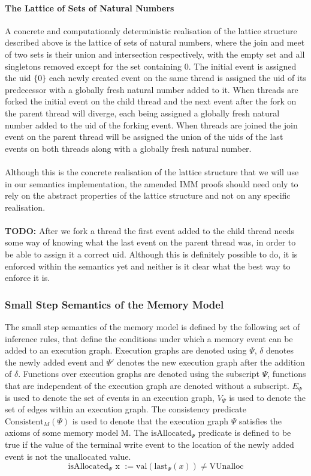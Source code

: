 \paragraph{The Lattice of Sets of Natural Numbers}
A concrete and computationaly deterministic realisation of the lattice structure described above is the lattice of sets of natural numbers, where the join and meet of two sets is their union and intersection respectively, with the empty set and all singletons removed except for the set containing 0.
The initial event is assigned the uid \(\{0\}\) each newly created event on the same thread is assigned the uid of its predecessor with a globally fresh natural number added to it. 
When threads are forked the initial event on the child thread and the next event after the fork on the parent thread will diverge, each being assigned a globally fresh natural number added to the uid of the forking event. 
When threads are joined the join event on the parent thread will be assigned the union of the uids of the last events on both threads along with a globally fresh natural number. \\\\ 
Although this is the concrete realisation of the lattice structure that we will use in our semantics implementation, the amended IMM proofs should need only to rely on the abstract properties of the lattice structure and not on any specific realisation.
\\\\
\textbf{TODO: } After we fork a thread the first event added to the child thread needs some way of knowing what the last event on the parent thread was, in order to be able to assign it a correct uid. Although this is definitely possible 
to do, it is enforced within the semantics yet and neither is it clear what the best way to enforce it is. 

\subsubsection{Small Step Semantics of the Memory Model}
The small step semantics of the memory model is defined by the following set of inference rules, that define the conditions under which a memory event can be added to an execution graph.
Execution graphs are denoted using \( \Psi \), \( \delta \) denotes the newly added event and \( \Psi' \) denotes the new execution graph after the addition of \( \delta \). 
Functions over execution graphs are denoted using the subscript \( \Psi \), functions that are independent of the execution graph are denoted without a subscript. 
\(E_{\Psi}\) is used to denote the set of events in an execution graph, \(V_{\Psi}\) is used to denote the set of edges within an execution graph. 
The consistency predicate \(\text{Consistent}_{M}(\Psi)\) is used to denote that the execution graph \(\Psi\) satisfies the axioms of some memory model M.
The \(\text{isAllocated}_{\Psi}\) predicate is defined to be true if the value of the terminal write event to the location of the newly added event is not the unallocated value. 
\[
    \text{isAllocated}_{\Psi} \text{ x } := \mathrm{val}(\mathrm{last}_{\Psi}(x))  \neq \mathrm{VUnalloc}
\] 

